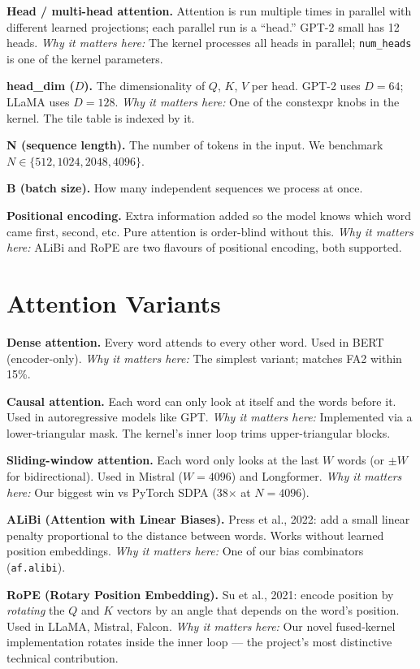 \documentclass[11pt]{article}
\newcommand{\term}[2]{%
  \par\smallskip
  \noindent\textbf{\color{blue!50!black}#1.} #2\par
}
\newcommand{\termw}[3]{%
  \par\smallskip
  \noindent\textbf{\color{blue!50!black}#1.} #2 \emph{\color{black!60}Why it matters here:} #3\par
}
\begin{document}
\termw{Head / multi-head attention}
{Attention is run multiple times in parallel with different learned
projections; each parallel run is a ``head.'' GPT-2 small has 12 heads.}
{The kernel processes all heads in parallel; \texttt{num\_heads} is one
of the kernel parameters.}

\termw{head\_dim ($D$)}
{The dimensionality of $Q$, $K$, $V$ per head. GPT-2 uses $D{=}64$;
LLaMA uses $D{=}128$.}
{One of the constexpr knobs in the kernel. The tile table is indexed by it.}

\term{N (sequence length)}
{The number of tokens in the input. We benchmark $N \in \{512, 1024, 2048, 4096\}$.}

\term{B (batch size)}
{How many independent sequences we process at once.}

\termw{Positional encoding}
{Extra information added so the model knows which word came first, second,
etc. Pure attention is order-blind without this.}
{ALiBi and RoPE are two flavours of positional encoding, both supported.}

\section{Attention Variants}

\termw{Dense attention}
{Every word attends to every other word. Used in BERT (encoder-only).}
{The simplest variant; matches FA2 within 15\%.}

\termw{Causal attention}
{Each word can only look at itself and the words before it. Used in
autoregressive models like GPT.}
{Implemented via a lower-triangular mask. The kernel's inner loop trims
upper-triangular blocks.}

\termw{Sliding-window attention}
{Each word only looks at the last $W$ words (or $\pm W$ for bidirectional).
Used in Mistral ($W{=}4096$) and Longformer.}
{Our biggest win vs PyTorch SDPA (38$\times$ at $N{=}4096$).}

\termw{ALiBi (Attention with Linear Biases)}
{Press et al., 2022: add a small linear penalty proportional to the
distance between words. Works without learned position embeddings.}
{One of our bias combinators (\texttt{af.alibi}).}

\termw{RoPE (Rotary Position Embedding)}
{Su et al., 2021: encode position by \emph{rotating} the $Q$ and $K$
vectors by an angle that depends on the word's position. Used in LLaMA,
Mistral, Falcon.}
{Our novel fused-kernel implementation rotates inside the inner loop ---
the project's most distinctive technical contribution.}
\end{document}
